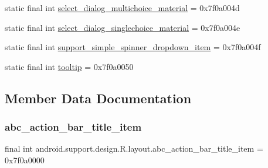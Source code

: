 \begin{DoxyCompactItemize}
\item 
static final int \mbox{\hyperlink{classandroid_1_1support_1_1design_1_1R_1_1layout_a3d2eb3f803ab59c599c7022c15479bb8}{select\+\_\+dialog\+\_\+multichoice\+\_\+material}} = 0x7f0a004d
\item 
static final int \mbox{\hyperlink{classandroid_1_1support_1_1design_1_1R_1_1layout_af908cc6a223fbe33d22bb3088dfc11b2}{select\+\_\+dialog\+\_\+singlechoice\+\_\+material}} = 0x7f0a004e
\item 
static final int \mbox{\hyperlink{classandroid_1_1support_1_1design_1_1R_1_1layout_a4de293b6e7223138532dd164026cd9c6}{support\+\_\+simple\+\_\+spinner\+\_\+dropdown\+\_\+item}} = 0x7f0a004f
\item 
static final int \mbox{\hyperlink{classandroid_1_1support_1_1design_1_1R_1_1layout_a73389a6a386a258d603d5ece03ee9eb9}{tooltip}} = 0x7f0a0050
\end{DoxyCompactItemize}


\subsection{Member Data Documentation}
\mbox{\label{classandroid_1_1support_1_1design_1_1R_1_1layout_a531b33a0bb0538dd1d077ef414f13912}} 
\subsubsection{\texorpdfstring{abc\+\_\+action\+\_\+bar\+\_\+title\+\_\+item}{abc\_action\_bar\_title\_item}}
{\footnotesize\ttfamily final int android.\+support.\+design.\+R.\+layout.\+abc\+\_\+action\+\_\+bar\+\_\+title\+\_\+item = 0x7f0a0000\hspace{0.3cm}{\ttfamily [static]}}

\mbox{\label{classandroid_1_1support_1_1design_1_1R_1_1layout_a65ed125f76e124be64ba517ed6388a2f}} 
